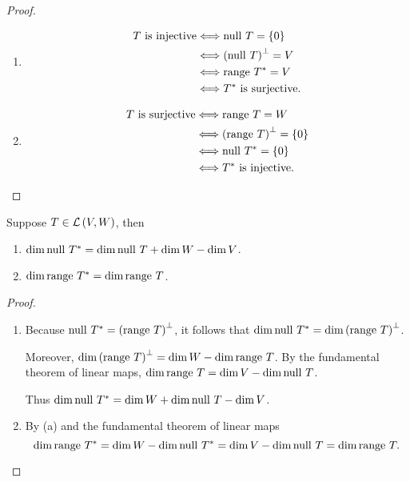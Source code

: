 \begin{proof}
    \begin{enumerate}[label={(\alph*)}]
        \item \begin{align*}
                  \text{$T$ is injective} & \Longleftrightarrow \operatorname{null}\,{T} = \{0\}            \\
                                          & \Longleftrightarrow {(\operatorname{null}\,{T})}^{\bot} = V     \\
                                          & \Longleftrightarrow \operatorname{range}\,{T^{*}} = V             \\
                                          & \Longleftrightarrow \text{$T^{*}$ is surjective}.
              \end{align*}
        \item \begin{align*}
                  \text{$T$ is surjective} & \Longleftrightarrow \operatorname{range}\,{T} = W                \\
                                           & \Longleftrightarrow {(\operatorname{range}\,{T})}^{\bot} = \{0\} \\
                                           & \Longleftrightarrow \operatorname{null}\,{T^{*}} = \{0\}       \\
                                           & \Longleftrightarrow \text{$T^{*}$ is injective}.
              \end{align*}
    \end{enumerate}
\end{proof}
\newpage

\begin{exercise}\label{chapter7:sectionA:exercise7}
    Suppose $T\in\mathcal{L}\left({V, W}\right)$, then
    \begin{enumerate}[label={(\alph*)}]
        \item $\dim \operatorname{null}\,{T^{*}} = \dim \operatorname{null}\,{T} + \dim W - \dim V$.
        \item $\dim \operatorname{range}\,{T^{*}} = \dim \operatorname{range}\,{T}$.
    \end{enumerate}
\end{exercise}

\begin{proof}
    \begin{enumerate}[label={(\alph*)}]
        \item Because $\operatorname{null}\,{T^{*}} = {(\operatorname{range}\,{T})}^{\bot}$, it follows that $\dim \operatorname{null}\,{T^{*}} = \dim {(\operatorname{range}\,{T})}^{\bot}$.

              Moreover, $\dim {(\operatorname{range}\,{T})}^{\bot} = \dim W - \dim \operatorname{range}\,{T}$. By the fundamental theorem of linear maps, $\dim\operatorname{range}\,{T} = \dim V - \dim\operatorname{null}\,{T}$.

              Thus $\dim\operatorname{null}\,{T^{*}} = \dim W + \dim\operatorname{null}\,{T} - \dim V$.
        \item By (a) and the fundamental theorem of linear maps
        \[
            \dim\operatorname{range}\,{T^{*}} = \dim W - \dim\operatorname{null}\,{T^{*}} = \dim V - \dim\operatorname{null}\,{T} = \dim\operatorname{range}\,{T}.
        \]
    \end{enumerate}
\end{proof}
\newpage

